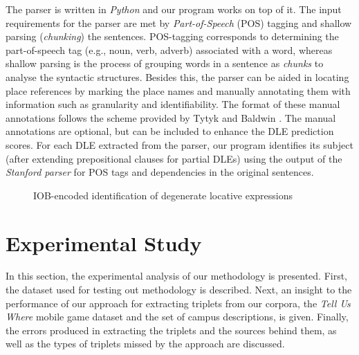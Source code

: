 \documentclass{acm_proc_article-sp}
\begin{document}
The parser is written in \textit{Python} and our program works on top of it. The input requirements for the parser are met by \textit{Part-of-Speech} (POS) tagging and shallow parsing (\textit{chunking}) the sentences. POS-tagging corresponds to determining the part-of-speech tag (e.g., noun, verb, adverb) associated with a word, whereas shallow parsing is the process of grouping words in a sentence as \textit{chunks} to analyse the syntactic structures. Besides this, the parser can be aided in locating place references by marking the place names and manually annotating them with information such as granularity and identifiability. The format of these manual annotations follows the scheme provided by Tytyk and Baldwin \cite{igor:annotations}. The manual annotations are optional, but can be included to enhance the DLE prediction scores. For each DLE extracted from the parser, our program identifies its subject (after extending prepositional clauses for partial DLEs) using the output of the \textit{Stanford parser} \cite{klein:accurate} for POS tags and dependencies in the original sentences.
\begin{figure}
\centering
\caption{IOB-encoded identification of degenerate locative expressions}
\label{fig:IOB}
\end{figure}
\section{Experimental Study}
\label{sec:experimentalstudy}
In this section, the experimental analysis of our methodology is presented. First, the dataset used for testing out methodology is described. Next, an insight to the performance of our approach for extracting triplets from our corpora, the \textit{Tell Us Where} mobile game dataset and the set of campus descriptions, is given.  Finally, the errors produced in extracting the triplets and the sources behind them, as well as the types of triplets missed by the approach are discussed.
\newpage
\end{document}
